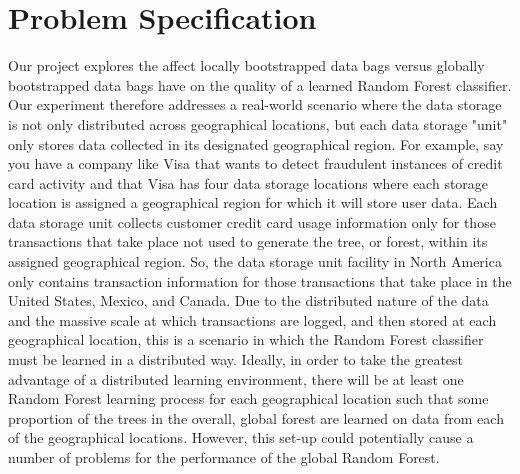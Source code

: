 \documentclass{sig-alternate-05-2015}
\begin{document}
\section{Problem Specification}
Our project explores the affect locally bootstrapped data bags versus globally bootstrapped data bags have on the quality of a learned Random Forest classifier. Our experiment therefore addresses a real-world scenario where the data storage is not only distributed across geographical locations, but each data storage "unit" only stores data collected in its designated geographical region. For example, say you have a company like Visa that wants to detect fraudulent instances of credit card activity and that Visa has four data storage locations where each storage location is assigned a geographical region for which it will store user data. Each data storage unit collects customer credit card usage information only for those transactions that take place not used to generate the tree, or forest, within its assigned geographical region. So, the data storage unit facility in North America only contains transaction information for those transactions that take place in the United States, Mexico, and Canada. Due to the distributed nature of the data and the massive scale at which transactions are logged, and then stored at each geographical location, this is a scenario in which the Random Forest classifier must be learned in a distributed way. Ideally, in order to take the greatest advantage of a distributed learning environment, there will be at least one Random Forest learning process for each geographical location such that some proportion of the trees in the overall, global forest are learned on data from each of the geographical locations. However, this set-up could potentially cause a number of problems for the performance of the global Random Forest.
\end{document}
